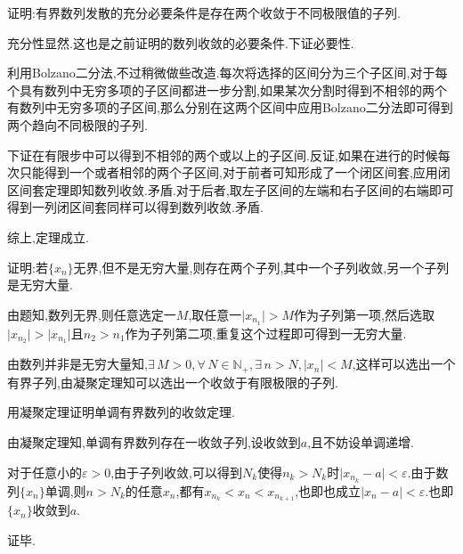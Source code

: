 \documentclass[cn,chinese,fontset]{elegantbook}
\begin{document}
      \begin{exercise}
          证明:有界数列发散的充分必要条件是存在两个收敛于不同极限值的子列.
      \end{exercise}
      \begin{solution}
          充分性显然.这也是之前证明的数列收敛的必要条件.下证必要性.

          利用Bolzano二分法,不过稍微做些改造.每次将选择的区间分为三个子区间,对于每个具有数列中无穷多项的子区间都进一步分割,如果某次分割时得到不相邻的两个有数列中无穷多项的子区间,那么分别在这两个区间中应用Bolzano二分法即可得到两个趋向不同极限的子列.

          下证在有限步中可以得到不相邻的两个或以上的子区间.反证,如果在进行的时候每次只能得到一个或者相邻的两个子区间,对于前者可知形成了一个闭区间套,应用闭区间套定理即知数列收敛.矛盾.对于后者,取左子区间的左端和右子区间的右端即可得到一列闭区间套同样可以得到数列收敛.矛盾.

          综上,定理成立.
      \end{solution}

      \begin{exercise}
          证明:若$\{x_n\}$无界,但不是无穷大量,则存在两个子列,其中一个子列收敛,另一个子列是无穷大量.
      \end{exercise}
      \begin{solution}
          由题知,数列无界,则任意选定一$M$,取任意一$\lvert x_{n_1}\rvert>M$作为子列第一项,然后选取$\lvert x_{n_2}\rvert>\lvert x_{n_1}\rvert$且$n_2>n_1$作为子列第二项,重复这个过程即可得到一无穷大量.

          由数列并非是无穷大量知,$\exists\, M>0,\forall\, N\in \mathbb{N}_+,\exists\, n>N,\lvert x_n\rvert<M$,这样可以选出一个有界子列,由凝聚定理知可以选出一个收敛于有限极限的子列.
      \end{solution}

      \begin{exercise}
          用凝聚定理证明单调有界数列的收敛定理.
      \end{exercise}
      \begin{solution}
          由凝聚定理知,单调有界数列存在一收敛子列,设收敛到$a$,且不妨设单调递增.

          对于任意小的$\varepsilon>0$,由于子列收敛,可以得到$N_k$使得$n_k>N_k$时$\lvert x_{n_k}-a\rvert<\varepsilon$.由于数列$\{x_n\}$单调,则$n>N_k$的任意$x_n$,都有$x_{n_k}<x_n<x_{n_{k+1}}$,也即也成立$\lvert x_n-a\rvert<\varepsilon$.也即$\{x_n\}$收敛到$a$.

          证毕.
      \end{solution}
\end{document}
